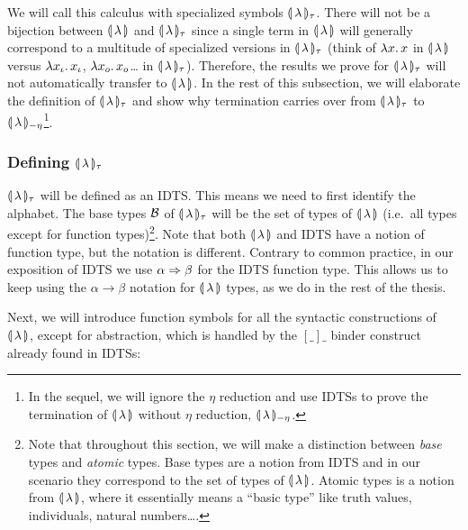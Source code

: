 We will call this calculus with specialized symbols
$\llparenthesis \, \lambda \, \rrparenthesis_\tau$. There will not be a bijection between
$\llparenthesis \, \lambda \, \rrparenthesis$ and $\llparenthesis \, \lambda \, \rrparenthesis_\tau$ since a single term in
$\llparenthesis \, \lambda \, \rrparenthesis$ will generally correspond to a multitude of specialized
versions in $\llparenthesis \, \lambda \, \rrparenthesis_\tau$ (think of $\lambda x.\, x$ in
$\llparenthesis \, \lambda \, \rrparenthesis$ versus $\lambda x_\iota.\, x_\iota$, $\lambda x_o.\, x_o$\ldots
in $\llparenthesis \, \lambda \, \rrparenthesis_\tau$). Therefore, the results we prove for
$\llparenthesis \, \lambda \, \rrparenthesis_\tau$ will not automatically transfer to
$\llparenthesis \, \lambda \, \rrparenthesis$. In the rest of this subsection, we will elaborate the
definition of $\llparenthesis \, \lambda \, \rrparenthesis_\tau$ and show why termination carries over
from $\llparenthesis \, \lambda \, \rrparenthesis_\tau$ to $\llparenthesis \, \lambda \, \rrparenthesis_{-\eta}$\footnote{In the
  sequel, we will ignore the $\eta$ reduction and use IDTSs to prove the
  termination of $\llparenthesis \, \lambda \, \rrparenthesis$ without $\eta$ reduction,
  $\llparenthesis \, \lambda \, \rrparenthesis_{-\eta}$.}.


\subsubsection{Defining $\llparenthesis \, \lambda \, \rrparenthesis_\tau$}
\label{sssec:banana-tau}

$\llparenthesis \, \lambda \, \rrparenthesis_\tau$ will be defined as an IDTS. This means we need to
first identify the alphabet. The base types $\mathcal{B}$ of
$\llparenthesis \, \lambda \, \rrparenthesis_\tau$ will be the set of types of $\llparenthesis \, \lambda \, \rrparenthesis$
(i.e.\ all types except for function types)\footnote{Note that throughout
  this section, we will make a distinction between \emph{base} types and
  \emph{atomic} types. Base types are a notion from IDTS and in our
  scenario they correspond to the set of types of
  $\llparenthesis \, \lambda \, \rrparenthesis$. Atomic types is a notion from $\llparenthesis \, \lambda \, \rrparenthesis$,
  where it essentially means a ``basic type'' like truth values,
  individuals, natural numbers\ldots.}. Note that both $\llparenthesis \, \lambda \, \rrparenthesis$
and IDTS have a notion of function type, but the notation is
different. Contrary to common practice, in our exposition of IDTS we use
$\alpha \Rightarrow \beta$ for the IDTS function type. This allows us to keep using
the $\alpha \to \beta$ notation for $\llparenthesis \, \lambda \, \rrparenthesis$ types, as we do in
the rest of the thesis.

Next, we will introduce function symbols for all the syntactic
constructions of $\llparenthesis \, \lambda \, \rrparenthesis$, except for abstraction, which is
handled by the $[\_]\_$ binder construct already found in IDTSs:

